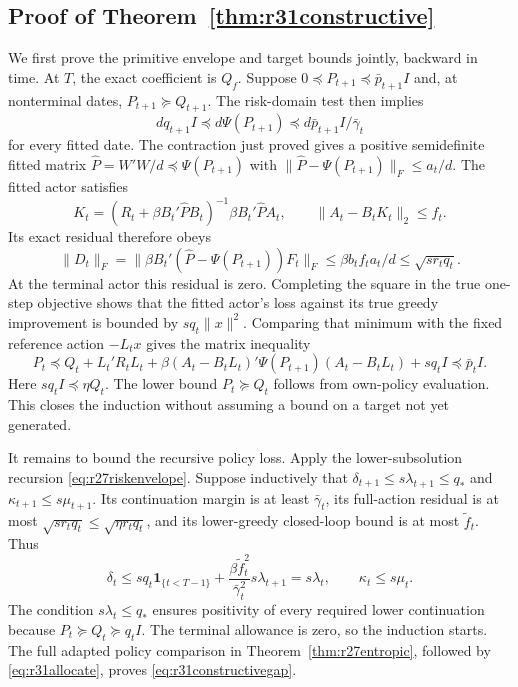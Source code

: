 \documentclass[ecta,nameyear,draft]{econsocart}
\theoremstyle{definition}
\theoremstyle{remark}
\begin{document}
\subsection{Proof of Theorem~\ref{thm:r31constructive}}
We first prove the primitive envelope and target bounds jointly, backward
in time. At $T$, the exact coefficient is $Q_f$. Suppose
$0\preceq P_{t+1}\preceq\bar p_{t+1}I$ and, at nonterminal dates,
$P_{t+1}\succeq Q_{t+1}$. The risk-domain test then implies
\[
 dq_{t+1}I\preceq d\Psi(P_{t+1})
       \preceq d\bar p_{t+1}I/\bar\gamma_t
\]
for every fitted date. The contraction just proved gives a positive
semidefinite fitted matrix $\widehat P= W'W/d\preceq\Psi(P_{t+1})$ with
$\|\widehat P-\Psi(P_{t+1})\|_F\leq a_t/d$.
The fitted actor satisfies
\[
 K_t=(R_t+\beta B_t'\widehat P B_t)^{-1}
                         \beta B_t'\widehat P A_t,
 \qquad \|A_t-B_tK_t\|_2\leq f_t.
\]
Its exact residual therefore obeys
\[
 \|D_t\|_F
 =\|\beta B_t'(\widehat P-\Psi(P_{t+1}))F_t\|_F
 \leq\beta b_tf_ta_t/d\leq\sqrt{s r_tq_t}.
\]
At the terminal actor this residual is zero. Completing the square in the
true one-step objective shows that the fitted actor's loss against its true
greedy improvement is bounded by $s q_t\|x\|^2$. Comparing that minimum
with the fixed reference action $-L_tx$ gives the matrix inequality
\[
 P_t\preceq Q_t+L_t'R_tL_t+
         \beta(A_t-B_tL_t)'\Psi(P_{t+1})(A_t-B_tL_t)+s q_tI
       \preceq\bar p_tI.
\]
Here $s q_tI\preceq\eta Q_t$. The lower bound $P_t\succeq Q_t$ follows
from own-policy evaluation. This closes the induction without assuming a
bound on a target not yet generated.

It remains to bound the recursive policy loss. Apply the lower-subsolution
recursion \eqref{eq:r27riskenvelope}. Suppose inductively that
$\delta_{t+1}\leq s\lambda_{t+1}\leq q_*$ and
$\kappa_{t+1}\leq s\mu_{t+1}$. Its continuation margin is at least
$\bar\gamma_t$, its full-action residual is at most
$\sqrt{s r_tq_t}\leq\sqrt{\eta r_tq_t}$, and its lower-greedy closed-loop
bound is at most $\widetilde f_t$. Thus
\[
 \delta_t\leq s q_t\mathbf1_{\{t<T-1\}}
       +\frac{\beta\widetilde f_t^2}{\bar\gamma_t^2}s\lambda_{t+1}
       =s\lambda_t,
 \qquad \kappa_t\leq s\mu_t.
\]
The condition $s\lambda_t\leq q_*$ ensures positivity of every required
lower continuation because $P_t\succeq Q_t\succeq q_tI$.
The terminal allowance is zero, so the induction starts. The full adapted
policy comparison in Theorem~\ref{thm:r27entropic}, followed by
\eqref{eq:r31allocate}, proves \eqref{eq:r31constructivegap}.
\end{document}
